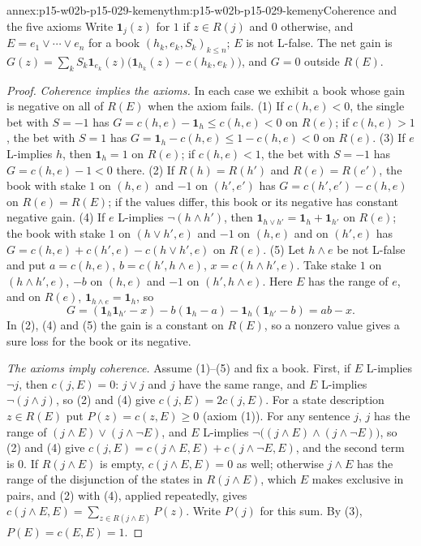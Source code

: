 \begin{annexitem}{annex:p15-w02b-p15-029-kemeny}{thm:p15-w02b-p15-029-kemeny}{Coherence and the five axioms}
Write \(\mathbf1_j(z)\) for \(1\) if \(z\in R(j)\) and \(0\)
otherwise, and \(E=e_1\lor\cdots\lor e_n\) for a book
\((h_k,e_k,S_k)_{k\leq n}\); \(E\) is not L-false. The net gain is
\(G(z)=\sum_kS_k\mathbf1_{e_k}(z)\bigl(\mathbf1_{h_k}(z)-c(h_k,e_k)\bigr)\),
and \(G=0\) outside \(R(E)\).
\begin{proof}
\emph{Coherence implies the axioms.} In each case we exhibit a book
whose gain is negative on all of \(R(E)\) when the axiom fails.
(1) If \(c(h,e)<0\), the single bet with \(S=-1\) has
\(G=c(h,e)-\mathbf1_h\leq c(h,e)<0\) on \(R(e)\); if \(c(h,e)>1\), the
bet with \(S=1\) has \(G=\mathbf1_h-c(h,e)\leq1-c(h,e)<0\) on
\(R(e)\). (3) If \(e\) L-implies \(h\), then \(\mathbf1_h=1\) on
\(R(e)\); if \(c(h,e)<1\), the bet with \(S=-1\) has \(G=c(h,e)-1<0\)
there. (2) If \(R(h)=R(h')\) and \(R(e)=R(e')\), the book with stake
\(1\) on \((h,e)\) and \(-1\) on \((h',e')\) has
\(G=c(h',e')-c(h,e)\) on \(R(e)=R(E)\); if the values differ, this book
or its negative has constant negative gain. (4) If \(e\) L-implies
\(\neg(h\land h')\), then \(\mathbf1_{h\lor h'}=\mathbf1_h+\mathbf1_{h'}\)
on \(R(e)\); the book with stake \(1\) on \((h\lor h',e)\) and \(-1\)
on \((h,e)\) and on \((h',e)\) has
\(G=c(h,e)+c(h',e)-c(h\lor h',e)\) on \(R(e)\). (5) Let \(h\land e\)
be not L-false and put \(a=c(h,e)\), \(b=c(h',h\land e)\),
\(x=c(h\land h',e)\). Take stake \(1\) on \((h\land h',e)\), \(-b\) on
\((h,e)\) and \(-1\) on \((h',h\land e)\). Here \(E\) has the range of
\(e\), and on \(R(e)\), \(\mathbf1_{h\land e}=\mathbf1_h\), so
\[
 G=(\mathbf1_h\mathbf1_{h'}-x)-b(\mathbf1_h-a)-\mathbf1_h(\mathbf1_{h'}-b)=ab-x.
\]
In (2), (4) and (5) the gain is a constant on \(R(E)\), so a nonzero
value gives a sure loss for the book or its negative.

\emph{The axioms imply coherence.} Assume (1)--(5) and fix a book.
First, if \(E\) L-implies \(\neg j\), then \(c(j,E)=0\): \(j\lor j\)
and \(j\) have the same range, and \(E\) L-implies
\(\neg(j\land j)\), so (2) and (4) give \(c(j,E)=2c(j,E)\). For a
state description \(z\in R(E)\) put \(P(z)=c(z,E)\geq0\) (axiom (1)).
For any sentence \(j\), \(j\) has the range of
\((j\land E)\lor(j\land\neg E)\), and \(E\) L-implies
\(\neg\bigl((j\land E)\land(j\land\neg E)\bigr)\), so (2) and (4) give
\(c(j,E)=c(j\land E,E)+c(j\land\neg E,E)\), and the second term is
\(0\). If \(R(j\land E)\) is empty, \(c(j\land E,E)=0\) as well;
otherwise \(j\land E\) has the range of the disjunction of the states
in \(R(j\land E)\), which \(E\) makes exclusive in pairs, and (2) with
(4), applied repeatedly, gives \(c(j\land E,E)=\sum_{z\in R(j\land E)}P(z)\).
Write \(P(j)\) for this sum. By (3), \(P(E)=c(E,E)=1\).


\end{proof}
\end{annexitem}
